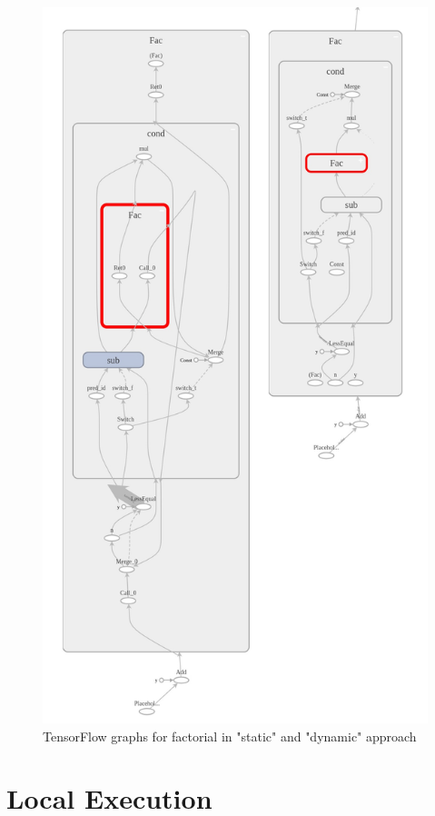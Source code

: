 \documentclass[ack,preface]{dithesis}
\begin{document}
\begin{figure}
\centering
\includegraphics[scale=0.42]{figures/tf_factorial}
\caption{TensorFlow graphs for factorial in "static" and "dynamic" approach}
\end{figure}



    \section{Local Execution}
\end{document}
